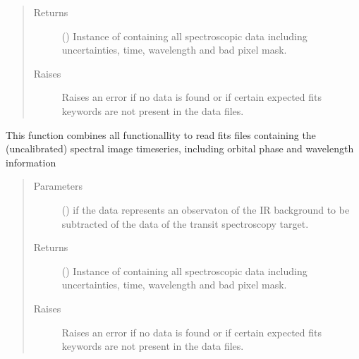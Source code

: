 \documentclass[a4paper,10pt,english]{sphinxmanual}
\begin{document}
\begin{fulllineitems}
\begin{fulllineitems}
\begin{quote}
\begin{description}
\item[{Returns}] \leavevmode
{} () \textendash{} Instance of  containing all spectroscopic
data including uncertainties, time, wavelength and bad pixel mask.

\item[{Raises}] \leavevmode
{} \textendash{} Raises an error if no data is found or if certain expected
fits keywords are not present in the data files.

\end{description}\end{quote}

\end{fulllineitems}


\begin{fulllineitems}
\label{\detokenize{cascade.instruments:cascade.instruments.instruments.HSTWFC3.get_spectral_images}}
This function combines all functionallity to read fits files
containing the (uncalibrated) spectral image timeseries, including
orbital phase and wavelength information
\begin{quote}\begin{description}
\item[{Parameters}] \leavevmode
{} () \textendash{} if  the data represents an observaton of the IR background
to be subtracted of the data of the transit spectroscopy target.

\item[{Returns}] \leavevmode
{} () \textendash{} Instance of  containing all spectroscopic
data including uncertainties, time, wavelength and bad pixel mask.

\item[{Raises}] \leavevmode
{} \textendash{} Raises an error if no data is found or if certain expected
fits keywords are not present in the data files.


\end{description}
\end{quote}
\end{fulllineitems}
\end{fulllineitems}
\end{document}
